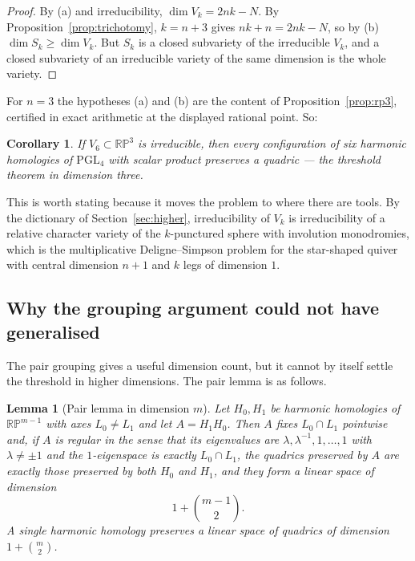 \documentclass[11pt,a4paper]{article}
\theoremstyle{plain}
\newtheorem{lemma}[theorem]{Lemma}
\newtheorem{corollary}[theorem]{Corollary}
\theoremstyle{definition}
\theoremstyle{remark}
\newcommand{\PGL}{\mathrm{PGL}}
\begin{document}
\begin{proof}
By (a) and irreducibility, $\dim V_k=2nk-N$. By Proposition~\ref{prop:trichotomy},
$k=n+3$ gives $nk+n=2nk-N$, so by (b) $\dim S_k\ge\dim V_k$. But $S_k$ is a closed
subvariety of the irreducible $V_k$, and a closed subvariety of an irreducible
variety of the same dimension is the whole variety.
\end{proof}

For $n=3$ the hypotheses (a) and (b) are the content of
Proposition~\ref{prop:rp3}, certified in exact arithmetic at the displayed
rational point. So:

\begin{corollary}\label{cor:rp3reduction}
If $V_6\subset\mathbb{RP}^3$ is irreducible, then every configuration of six
harmonic homologies of $\PGL_4$ with scalar product preserves a quadric --- the
threshold theorem in dimension three.
\end{corollary}

This is worth stating because it moves the problem to where there are tools. By the
dictionary of Section~\ref{sec:higher}, irreducibility of $V_k$ is irreducibility of
a relative character variety of the $k$-punctured sphere with involution monodromies,
which is the multiplicative Deligne--Simpson problem for the star-shaped quiver with
central dimension $n+1$ and $k$ legs of dimension $1$.

\subsection{Why the grouping argument could not have generalised}

The pair grouping gives a useful dimension count, but it cannot by itself settle the
threshold in higher dimensions. The pair lemma is as follows.

\begin{lemma}[Pair lemma in dimension $m$]\label{lem:pairgen}
Let $H_0,H_1$ be harmonic homologies of $\mathbb{RP}^{m-1}$ with axes $L_0\neq L_1$
and let $A=H_1H_0$. Then $A$ fixes $L_0\cap L_1$ pointwise and, if $A$ is regular
in the sense that its eigenvalues are $\lambda,\lambda^{-1},1,\dots,1$ with
$\lambda\neq\pm1$ and the $1$-eigenspace is exactly $L_0\cap L_1$, the quadrics
preserved by $A$ are exactly those preserved by \emph{both} $H_0$ and $H_1$, and
they form a linear space of dimension
\[
  1+\binom{m-1}2 .
\]
A single harmonic homology preserves a linear space of quadrics of dimension
$1+\binom m2$.
\end{lemma}
\end{document}

